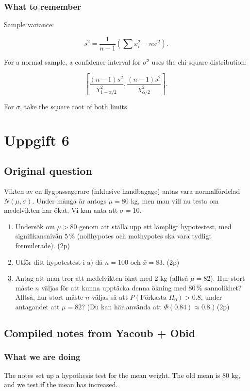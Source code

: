 \documentclass[10pt]{article}
\begin{document}
\subsubsection*{What to remember}
Sample variance:

\[
s^2
=
\frac{1}{n-1}
\left(
\sum x_i^2-n\bar{x}^{\,2}
\right).
\]

For a normal sample, a confidence interval for $\sigma^2$ uses
the chi-square distribution:

\[
\left[
\frac{(n-1)s^2}{\chi^2_{1-\alpha/2}},
\frac{(n-1)s^2}{\chi^2_{\alpha/2}}
\right].
\]

For $\sigma$, take the square root of both limits.

\section*{Uppgift 6}

\subsection*{Original question}
Vikten av en flygpassagerare (inklusive handbagage) antas vara
normalfördelad $N(\mu,\sigma)$. Under många år antogs $\mu=80$ kg,
men man vill nu testa om medelvikten har ökat.
Vi kan anta att $\sigma=10$.

\begin{enumerate}[label=\alph*)]
\item
Undersök om $\mu>80$ genom att ställa upp ett lämpligt hypotestest,
med signifikansnivån $5\,\%$ (nollhypotes och mothypotes ska vara
tydligt formulerade).
\hfill (2p)

\item
Utför ditt hypotestest i a) då $n=100$ och $\bar{x}=83$.
\hfill (2p)

\item
Antag att man tror att medelvikten ökat med 2 kg
(alltså $\mu=82$). Hur stort måste $n$ väljas för att kunna
upptäcka denna ökning med $80\,\%$ sannolikhet?
Alltså, hur stort måste $n$ väljas så att
$P(\text{Förkasta }H_0)>0.8$, under antagandet att $\mu=82$?
(Du kan här använda att $\Phi(0.84)\approx 0.8$.)
\hfill (2p)
\end{enumerate}

\subsection*{Compiled notes from Yacoub + Obid}

\subsubsection*{What we are doing}
The notes set up a hypothesis test for the mean weight.
The old mean is $80$ kg, and we test if the mean has increased.
\end{document}
